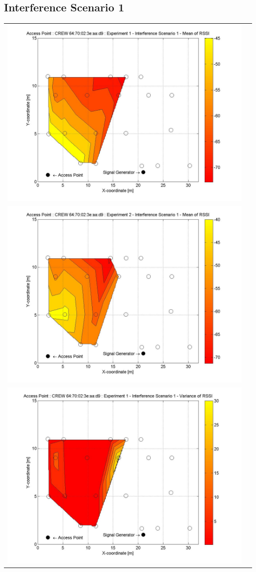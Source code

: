 \documentclass[11pt,a4paper,headinclude,footinclude,chapterprefix=on]{scrreprt}
\begin{document}
\subsection{Interference Scenario 1} 
\begin{longtable}
	{lr} 
	\includegraphics[width=13cm]{../../Source/plot/CREW_d9/d9_Sig_Ex_1_Mean.jpg} \\
	\includegraphics[width=13cm]{../../Source/plot/CREW_d9/d9_Sig_Ex_2_Mean.jpg} \\
	\includegraphics[width=13cm]{../../Source/plot/CREW_d9/d9_Sig_Ex_1_Variance.jpg} \\

\end{longtable}
\end{document}
